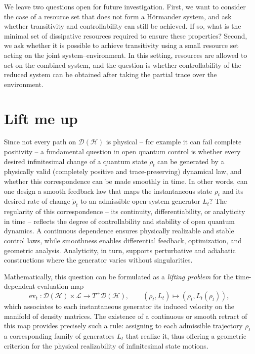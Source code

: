 \documentclass[11pt,reqno]{amsart}
\theoremstyle{definition}
\newcommand{\mc}{\mathcal}
\DeclareMathOperator{\ev}{ev}
\begin{document}
We leave two questions open for future investigation.
First, we want to consider the case of a resource set that does not form a Hörmander system, and ask whether transitivity and controllability can still be achieved. If so, what is the minimal set of dissipative resources required to ensure these properties?
Second, we ask whether it is possible to achieve transitivity using a small resource set acting on the joint system–environment. In this setting, resources are allowed to act on the combined system, and the question is whether controllability of the reduced system can be obtained after taking the partial trace over the environment.


\section{Lift me up}\label{lift}
Since not every path on $\mc D(\mc H)$ is physical -- for example it can fail complete positivity -- a fundamental question in open quantum control is whether every desired infinitesimal change of a quantum state $\dot{\rho}_t$ can be generated by a physically valid (completely positive and trace-preserving) dynamical law, and whether this correspondence can be made smoothly in time. In other words, can one design a smooth feedback law that maps the instantaneous state $\rho_t$ and its desired rate of change $\dot{\rho}_t$ to an admissible open-system generator $L_t$? The regularity of this correspondence -- its continuity, differentiability, or analyticity in time -- reflects the degree of controllability and stability of open quantum dynamics. A continuous dependence ensures physically realizable and stable control laws, while smoothness enables differential feedback, optimization, and geometric analysis. Analyticity, in turn, supports perturbative and adiabatic constructions where the generator varies without singularities.

Mathematically, this question can be formulated as a \emph{lifting problem} for the time-dependent evaluation map
\[
\ev_t: \mc D(\mc{H}) \times \mc L \to T^+\mc D(\mc{H}), 
\qquad 
(\rho_t, L_t) \mapsto (\rho_t, L_t(\rho_t)),
\]
which associates to each instantaneous generator its induced velocity on the manifold of density matrices. The existence of a continuous or smooth retract of this map provides precisely such a rule: assigning to each admissible trajectory $\rho_t$ a corresponding family of generators $L_t$ that realize it, thus offering a geometric criterion for the physical realizability of infinitesimal state motions.
\end{document}
